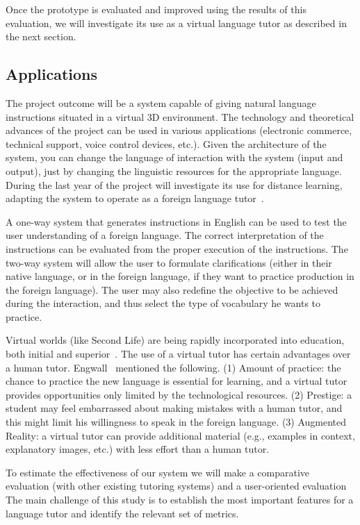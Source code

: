 Once the prototype is evaluated and improved using the results
of this evaluation, we will investigate its use as a virtual language tutor as
described in the next section.

\subsection{Applications}

The project outcome will be a system capable of giving natural language
instructions situated in a virtual 3D environment. The technology and
theoretical advances of the project can be used in various applications
(electronic commerce, technical support, voice control devices, etc.). 
Given the architecture of the system, you can change the language of interaction
with the system (input and output), just by changing the linguistic resources
for the appropriate language. During
the last year of the project will investigate its use for distance learning,
adapting the system to operate as a foreign language
tutor~\cite{Eskenazi09,Wik09}.



A one-way system that generates instructions in English can be used to test the
user understanding of a foreign language. The correct interpretation of the
instructions can be evaluated from the proper execution of the instructions. The
two-way system will allow the user to formulate clarifications (either in their
native language, or in the foreign language, if they want to practice
production in the foreign language). The user may also redefine the
objective to be achieved during the interaction, and thus select the type of
vocabulary he wants to practice.

Virtual worlds (like Second Life) are being rapidly incorporated into
education, both initial and superior~\cite{Doswell05,molk:lear09}. The use of a
virtual tutor has certain advantages over a human tutor.
Engwall~ mentioned the following. (1) Amount of
practice: the chance to practice the new language is essential for learning, and
a virtual tutor provides opportunities only limited by the
technological resources. (2) Prestige: a student
may feel embarrassed about making mistakes with a human tutor, and this
might limit his willingness to speak in the foreign language. (3) Augmented
Reality: a virtual
tutor can provide additional material (e.g., examples in context, explanatory
images, etc.) with less effort than a human tutor.

To estimate the effectiveness of our system we will make a comparative
evaluation (with other existing tutoring systems) and a user-oriented evaluation
The main challenge of this study is to establish the most important features for
a language tutor and identify the relevant set of metrics. 








